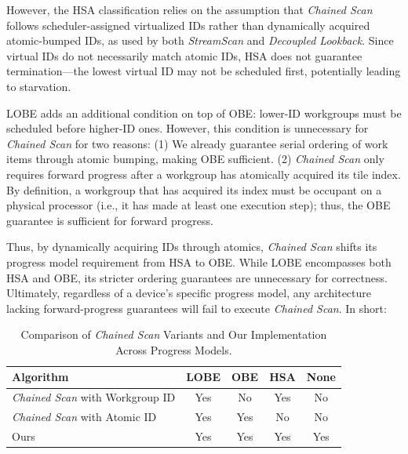 \documentclass[acmsmall, manuscript, screen, review, anonymous]{acmart}
\begin{document}
However, the HSA classification relies on the assumption that \emph{Chained Scan} follows scheduler-assigned virtualized IDs rather than dynamically acquired atomic-bumped IDs, as used by both \emph{StreamScan} and \emph{Decoupled Lookback}. Since virtual IDs do not necessarily match atomic IDs, HSA does not guarantee termination---the lowest virtual ID may not be scheduled first, potentially leading to starvation.

LOBE adds an additional condition on top of OBE\@: lower-ID workgroups must be scheduled before higher-ID ones. However, this condition is unnecessary for \emph{Chained Scan} for two reasons: (1) We already guarantee serial ordering of work items through atomic bumping, making OBE sufficient. (2) \emph{Chained Scan} only requires forward progress after a workgroup has atomically acquired its tile index. By definition, a workgroup that has acquired its index must be occupant on a physical processor (i.e., it has made at least one execution step); thus, the OBE guarantee is sufficient for forward progress.

Thus, by dynamically acquiring IDs through atomics, \emph{Chained Scan} shifts its progress model requirement from HSA to OBE. While LOBE encompasses both HSA and OBE, its stricter ordering guarantees are unnecessary for correctness. Ultimately, regardless of a device's specific progress model, any architecture lacking forward-progress guarantees will fail to execute \emph{Chained Scan}. In short:

\begin{table}[h!]
  \small
  \centering
  \begin{tabular}{lcccc}
    \toprule
    Algorithm                             & LOBE & OBE & HSA & None \\
    \midrule
    \emph{Chained Scan} with Workgroup ID & Yes  & No  & Yes & No   \\
    \emph{Chained Scan} with Atomic ID    & Yes  & Yes & No  & No   \\
    Ours                                  & Yes  & Yes & Yes & Yes  \\
    \bottomrule
  \end{tabular}
  \caption{Comparison of \emph{Chained Scan} Variants and Our Implementation Across Progress Models.\label{tab:progress_models}}
\end{table}
\end{document}

